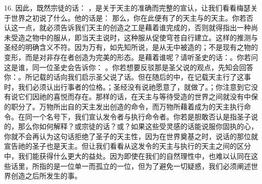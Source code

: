 16. 因此，既然宗徒的话： ，是关于天主的准确而完整的宣认，让我们看看梅瑟关于世界之初说了什么。他的话是：  那么，你在此便有了的天主与的天主。你若否认这一点，就必须告诉我们天主的创造之工是藉着谁完成的，否则就得指出一种尚未受造之物中的服从，即当天主说时，这种服从促使穹苍自行建立。这样的推测与圣经的明确含义不符。因为万有，如先知所说，是从无中被造的；不是现有之物的变形，而是对非存在者创造为完美的形态。是藉着谁呢？请听圣史的话：。你若问这是谁，同一位圣史会告诉你： 。你若想要反驳那是圣父说的观点，先知会回答你：。所记载的话向我们启示圣父说了话。但在随后的中，在记载天主行了这事时，我们必须认出行事者的位格。；圣经没有说祂愿意了，就做了。；你注意到它没有说它们因祂的喜悦而存在。那样的话，在天主与等待受造的世界之间就没有中保的职分了。万物所出自的天主发出创造的命令，而万物所藉着成为的天主执行命令。在同一个名号下，我们宣认发令者与执行命令者。你若是胆敢否认是指圣子说的，那么你如何解释？或宗徒的话？或？如果这些受灵感的话能说服你固执的心，你就不会再认为这句话拒绝了圣子的天主性，因为在世界奠基之时，说话的那位就宣告祂的圣子也是天主。但让我们看看从这发令的天主与执行的天主之间的区分中，我们能获得什么更大的益处。因为即使在我们的自然理性中，也难以认同在这些话里，所指的是一位单一而孤立的一位，但为了避免一切疑惑，我们必须阐述世界创造之后所发生的事。\par

